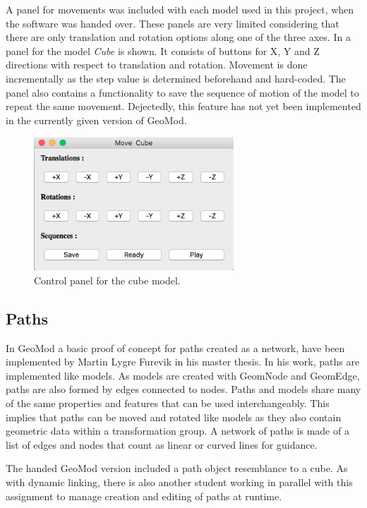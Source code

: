 A panel for movements was included with each model used in this project, when the software was handed over. These panels are very limited considering that there are only translation and rotation options along one of the three axes. In  a panel for the model \textit{Cube} is shown. It consists of buttons for X, Y and Z directions with respect to translation and rotation. Movement is done incrementally as the step value is determined beforehand and hard-coded. The panel also contains a functionality to save the sequence of motion of the model to repeat the same movement. Dejectedly, this feature has not yet been implemented in the currently given version of GeoMod. 

\begin{figure}[ht]
    \centering
    \includegraphics[height=5cm]{images/control_cube.png}
    \caption[Control panel for the cube model]{Control panel for the cube model.}
    \label{fig:controlcube}
\end{figure}


\subsection{Paths}

In GeoMod a basic proof of concept for paths created as a network, have been implemented by Martin Lygre Furevik in his master thesis. In his work, paths are implemented like models. As models are created with GeomNode and GeomEdge, paths are also formed by edges connected to nodes. Paths and models share many of the same properties and features that can be used interchangeably. This implies that paths can be moved and rotated like models as they also contain geometric data within a transformation group. A network of paths is made of a list of edges and nodes that count as linear or curved lines for guidance. 

The handed GeoMod version included a path object resemblance to a cube. As with dynamic linking, there is also another student working in parallel with this assignment to manage creation and editing of paths at runtime.
